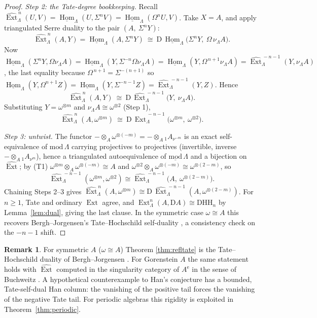 \documentclass[11pt]{amsart}
\theoremstyle{definition}
\newtheorem{remark}[theorem]{Remark}
\newcommand{\HH}{\mathrm{HH}}
\newcommand{\D}{\mathrm{D}}
\newcommand{\Ext}{\operatorname{Ext}}
\newcommand{\sExt}{\widehat{\operatorname{Ext}}}
\newcommand{\sHom}{\underline{\operatorname{Hom}}}
\newcommand{\Ae}{A^{\mathrm{e}}}
\begin{document}
\begin{proof}
\emph{Step 2: the Tate-degree bookkeeping.} Recall
$\sExt^{\,n}_\Lambda(U,V)=\sHom_\Lambda(U,\Sigma^nV)=\sHom_\Lambda(\Omega^nU,V)$.
Take $X=A$, and apply triangulated Serre duality to the pair
$(A,\ \Sigma^nY)$:
\[
\sExt^{\,n}_\Lambda(A,Y)=\sHom_\Lambda(A,\Sigma^nY)
\ \cong\ \D\,\sHom_\Lambda\bigl(\Sigma^nY,\ \Omega\,\nu_\Lambda A\bigr).
\]
Now $\sHom_\Lambda(\Sigma^nY,\Omega\nu_\Lambda A)
=\sHom_\Lambda(Y,\Sigma^{-n}\Omega\nu_\Lambda A)
=\sHom_\Lambda(Y,\Omega^{\,n+1}\nu_\Lambda A)
=\sExt^{\,-n-1}_\Lambda(Y,\nu_\Lambda A)$,
the last equality because $\Omega^{\,n+1}=\Sigma^{-(n+1)}$ so
$\sHom_\Lambda(Y,\Omega^{n+1}Z)=\sHom_\Lambda(Y,\Sigma^{-n-1}Z)
=\sExt^{\,-n-1}_\Lambda(Y,Z)$. Hence
\[
\sExt^{\,n}_\Lambda(A,Y)\ \cong\ \D\,\sExt^{\,-n-1}_\Lambda\bigl(Y,\ \nu_\Lambda A\bigr).
\]
Substituting $Y=\omega^{\otimes m}$ and $\nu_\Lambda A\cong\omega^{\otimes2}$
(Step 1),
\[
\sExt^{\,n}_\Lambda(A,\omega^{\otimes m})
\ \cong\ \D\,\sExt^{\,-n-1}_\Lambda\bigl(\omega^{\otimes m},\ \omega^{\otimes2}\bigr).
\]

\emph{Step 3: untwist.} The functor $-\otimes_A\omega^{\otimes(-m)}
=-\otimes_A{}_1A_{\nu^{-m}}$ is an exact self-equivalence of
$\mathrm{mod}\,\Lambda$ carrying projectives to projectives (invertible, inverse
$-\otimes_A{}_1A_{\nu^m}$), hence a triangulated autoequivalence of
$\underline{\mathrm{mod}}\,\Lambda$ and a bijection on $\sExt$; by (T1)
$\omega^{\otimes m}\otimes_A\omega^{\otimes(-m)}\cong A$ and
$\omega^{\otimes2}\otimes_A\omega^{\otimes(-m)}\cong\omega^{\otimes(2-m)}$, so
\[
\sExt^{\,-n-1}_\Lambda(\omega^{\otimes m},\omega^{\otimes2})
\cong\sExt^{\,-n-1}_\Lambda\bigl(A,\ \omega^{\otimes(2-m)}\bigr).
\]
Chaining Steps 2--3 gives
$\sExt^{\,n}_\Lambda(A,\omega^{\otimes m})\cong
\D\,\sExt^{\,-n-1}_\Lambda(A,\omega^{\otimes(2-m)})$. For $n\ge1$, Tate and
ordinary $\Ext$ agree, and $\Ext^n_\Lambda(A,\D A)\cong\D\HH_n$ by
Lemma~\ref{lem:dual}, giving the last clause. In the symmetric case
$\omega\cong A$ this recovers Bergh--Jorgensen's Tate--Hochschild self-duality
\cite{BerghJorgensen}, a consistency check on the $-n-1$ shift.
\end{proof}

\begin{remark}
For symmetric $A$ ($\omega\cong A$) Theorem \ref{thm:refltate} is the
Tate--Hochschild duality of Bergh--Jorgensen \cite{BerghJorgensen}. For
Gorenstein $A$ the same statement holds with $\sExt$ computed in the
singularity category of $\Ae$ in the sense of Buchweitz \cite{Buchweitz}. A
hypothetical counterexample to Han's conjecture has a bounded, Tate-self-dual
Han column: the vanishing of the positive tail forces the vanishing of the
negative Tate tail. For periodic algebras this rigidity is exploited in
Theorem~\ref{thm:periodic}.
\end{remark}
\end{document}
